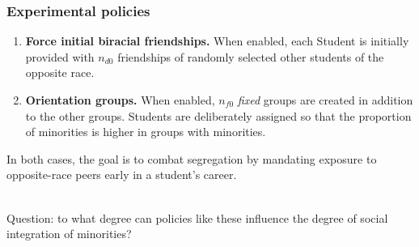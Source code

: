 \documentclass{beamer}
\begin{document}
\begin{frame}
\frametitle{Experimental policies}

\begin{enumerate}

\item \textbf{Force initial biracial friendships.} When enabled, each Student
is initially provided with $n_{d0}$ friendships of randomly selected other
students of the opposite race.

\item \textbf{Orientation groups.} When enabled, $n_{f0}$ \textit{fixed}
groups are created in addition to the other groups. Students are deliberately
assigned so that the proportion of minorities is higher in groups with
minorities.

\end{enumerate}

In both cases, the goal is to combat segregation by mandating exposure to
opposite-race peers early in a student's career.

~~\\

Question: to what degree can policies like these influence the degree of social
integration of minorities?
\end{frame}

\end{document}
